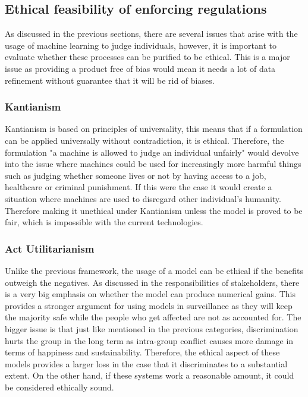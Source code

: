\subsection{Ethical feasibility of enforcing regulations}
As discussed in the previous sections, there are several issues that arise with the usage of machine learning to judge individuals, however, it is important to evaluate whether these processes can be purified to be ethical. This is a major issue as providing a product free of bias would mean it needs a lot of data refinement without guarantee that it will be rid of biases.

\subsubsection{Kantianism}
Kantianism is based on principles of universality, this means that if a formulation can be applied universally without contradiction, it is ethical. Therefore, the formulation "a machine is allowed to judge an individual unfairly" would devolve into the issue where machines could be used for increasingly more harmful things such as judging whether someone lives or not by having access to a job, healthcare or criminal punishment. If this were the case it would create a situation where machines are used to disregard other individual's humanity. Therefore making it unethical under Kantianism unless the model is proved to be fair, which is impossible with the current technologies.

\subsubsection{Act Utilitarianism}
Unlike the previous framework, the usage of a model can be ethical if the benefits outweigh the negatives. As discussed in the responsibilities of stakeholders, there is a very big emphasis on whether the model can produce numerical gains. This provides a stronger argument for using models in surveillance as they will keep the majority safe while the people who get affected are not as accounted for. The bigger issue is that just like mentioned in the previous categories, discrimination hurts the group in the long term as intra-group conflict causes more damage in terms of happiness and sustainability. Therefore, the ethical aspect of these models provides a larger loss in the case that it discriminates to a substantial extent. On the other hand, if these systems work a reasonable amount, it could be considered ethically sound.

